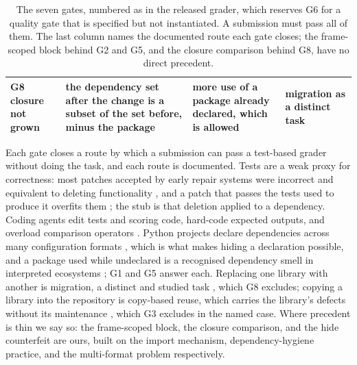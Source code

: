 \documentclass[11pt]{article}
\begin{document}
\begin{table}[t]
\begin{tabular}{p{2.0cm}p{5.2cm}p{4.2cm}p{3.6cm}}
G8 closure not grown & the dependency set after the change is a subset of the set before, minus the package & more use of a package already declared, which is allowed & migration as a distinct task \citep{islam2023characterizing} \\
\hline
\end{tabular}
\caption{The seven gates, numbered as in the released grader, which reserves G6 for a quality gate that is specified but not instantiated. A submission must pass all of them. The last column names the documented route each gate closes; the frame-scoped block behind G2 and G5, and the closure comparison behind G8, have no direct precedent.}
\label{tab:gates}
\end{table}

Each gate closes a route by which a submission can pass a test-based grader without doing the task, and each route is documented.
Tests are a weak proxy for correctness: most patches accepted by early repair systems were incorrect and equivalent to deleting functionality \citep{qi2015kali}, and a patch that passes the tests used to produce it overfits them \citep{smith2015cure}; the stub is that deletion applied to a dependency.
Coding agents edit tests and scoring code, hard-code expected outputs, and overload comparison operators \citep{metr2025rewardhacking,zhong2025impossiblebench}.
Python projects declare dependencies across many configuration formats \citep{pytrim2025}, which is what makes hiding a declaration possible, and a package used while undeclared is a recognised dependency smell in interpreted ecosystems \citep{jafari2021smells}; G1 and G5 answer each.
Replacing one library with another is migration, a distinct and studied task \citep{islam2023characterizing}, which G8 excludes; copying a library into the repository is copy-based reuse, which carries the library's defects without its maintenance \citep{jahanshahi2024copyreuse}, which G3 excludes in the named case.
Where precedent is thin we say so: the frame-scoped block, the closure comparison, and the hide counterfeit are ours, built on the import mechanism, dependency-hygiene practice, and the multi-format problem respectively.
\end{document}
